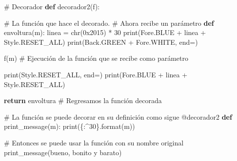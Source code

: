 \documentclass[
  spanish,
  letterpaper,
]{scrbook}
\newenvironment{Shaded}{\begin{snugshade}}{\end{snugshade}}
\newcommand{\AttributeTok}[1]{\textcolor[rgb]{0.40,0.45,0.13}{#1}}
\newcommand{\BaseNTok}[1]{\textcolor[rgb]{0.68,0.00,0.00}{#1}}
\newcommand{\BuiltInTok}[1]{\textcolor[rgb]{0.00,0.23,0.31}{#1}}
\newcommand{\CommentTok}[1]{\textcolor[rgb]{0.37,0.37,0.37}{#1}}
\newcommand{\ControlFlowTok}[1]{\textcolor[rgb]{0.00,0.23,0.31}{\textbf{#1}}}
\newcommand{\DecValTok}[1]{\textcolor[rgb]{0.68,0.00,0.00}{#1}}
\newcommand{\KeywordTok}[1]{\textcolor[rgb]{0.00,0.23,0.31}{\textbf{#1}}}
\newcommand{\NormalTok}[1]{\textcolor[rgb]{0.00,0.23,0.31}{#1}}
\newcommand{\OperatorTok}[1]{\textcolor[rgb]{0.37,0.37,0.37}{#1}}
\newcommand{\SpecialCharTok}[1]{\textcolor[rgb]{0.37,0.37,0.37}{#1}}
\newcommand{\StringTok}[1]{\textcolor[rgb]{0.13,0.47,0.30}{#1}}
\theoremstyle{definition}
\theoremstyle{remark}
\begin{document}
\begin{Shaded}
\begin{Highlighting}[]
\CommentTok{\# Decorador}
\KeywordTok{def}\NormalTok{ decorador2(f):}

    \CommentTok{\# La función que hace el decorado.}
    \CommentTok{\# Ahora recibe un parámetro}
    \KeywordTok{def}\NormalTok{ envoltura(m):}
\NormalTok{        linea }\OperatorTok{=} \BuiltInTok{chr}\NormalTok{(}\BaseNTok{0x2015}\NormalTok{) }\OperatorTok{*} \DecValTok{30}
        \BuiltInTok{print}\NormalTok{(Fore.BLUE }\OperatorTok{+}\NormalTok{ linea }\OperatorTok{+}\NormalTok{ Style.RESET\_ALL)}
        \BuiltInTok{print}\NormalTok{(Back.GREEN }\OperatorTok{+}\NormalTok{ Fore.WHITE, end}\OperatorTok{=}\StringTok{\textquotesingle{}\textquotesingle{}}\NormalTok{)}
        
\NormalTok{        f(m) }\CommentTok{\# Ejecución de la función que se recibe como parámetro}
        
        \BuiltInTok{print}\NormalTok{(Style.RESET\_ALL, end}\OperatorTok{=}\StringTok{\textquotesingle{}\textquotesingle{}}\NormalTok{)}
        \BuiltInTok{print}\NormalTok{(Fore.BLUE }\OperatorTok{+}\NormalTok{ linea }\OperatorTok{+}\NormalTok{ Style.RESET\_ALL)}

    \ControlFlowTok{return}\NormalTok{ envoltura }\CommentTok{\# Regresamos la función decorada}
\end{Highlighting}
\end{Shaded}

\begin{Shaded}
\begin{Highlighting}[]
\CommentTok{\# La función se puede decorar en su definición como sigue}
\AttributeTok{@decorador2}
\KeywordTok{def}\NormalTok{ print\_message(m):}
    \BuiltInTok{print}\NormalTok{(}\StringTok{\textquotesingle{}}\SpecialCharTok{\{:\^{}30\}}\StringTok{\textquotesingle{}}\NormalTok{.}\BuiltInTok{format}\NormalTok{(m))}
\end{Highlighting}
\end{Shaded}

\begin{Shaded}
\begin{Highlighting}[]
\CommentTok{\# Entonces se puede usar la función con su nombre original}
\NormalTok{print\_message(}\StringTok{\textquotesingle{}bueno, bonito y barato\textquotesingle{}}\NormalTok{)}
\end{Highlighting}
\end{Shaded}
\end{document}
